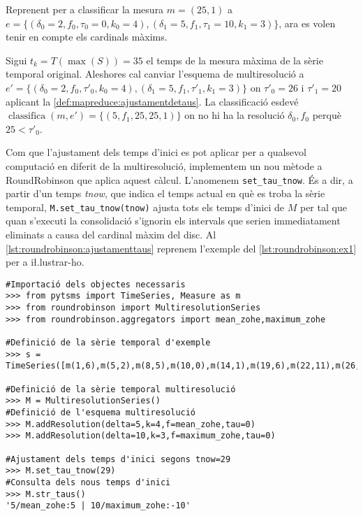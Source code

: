 \begin{example}
  \label{ex:mapreduce:classifica-ajustament}
  Reprenent  per a
  classificar la mesura $m=(25,1)$ a
  $e=\{(\delta_0=2,f_0,\tau_0=0,k_0=4),(\delta_1=5,f_1,\tau_1=10,k_1=3)\}$,
  ara es volen tenir en compte els cardinals màxims.
    
  Sigui $t_k=T(\max(S))=35$ el temps de la mesura màxima de la sèrie
  temporal original. Aleshores cal canviar l'esquema de multiresolució
  a
  $e'=\{(\delta_0=2,f_0,\tau'_0,k_0=4),(\delta_1=5,f_1,\tau'_1,k_1=3)\}$
  on $\tau'_0=26$ i $\tau'_1=20$ aplicant la
  \autoref{def:mapreduce:ajustamentdetaus}. La classificació esdevé
  $\operatorname{classifica}(m,e')=\{ (5,f_1,25,25,1) \}$ on no hi ha
  la resolució $\delta_0,f_0$ perquè $25< \tau'_0$.
\end{example}




Com que l'ajustament dels temps d'inici es pot aplicar per a qualsevol
computació en diferit de la multiresolució, implementem un nou mètode
a RoundRobinson que aplica aquest càlcul. L'anomenem
\lstinline[style=py]+set_tau_tnow+. És a dir, a partir d'un temps
\emph{tnow}, que indica el temps actual en què es troba la sèrie
temporal, \lstinline[style=py]+M.set_tau_tnow(tnow)+ ajusta tots els
temps d'inici de $M$ per tal que quan s'executi la consolidació
s'ignorin els intervals que serien immediatament eliminats a causa del
cardinal màxim del disc.  Al
\autoref{lst:roundrobinson:ajustamenttaus} reprenem l'exemple del
\autoref{lst:roundrobinson:ex1} per a i\l.lustrar-ho.

\begin{lstlisting}[style=py,caption=Exemple d'ajustament dels temps
    d'inici amb RoundRobinson,label=lst:roundrobinson:ajustamenttaus]
#Importació dels objectes necessaris
>>> from pytsms import TimeSeries, Measure as m
>>> from roundrobinson import MultiresolutionSeries
>>> from roundrobinson.aggregators import mean_zohe,maximum_zohe

#Definició de la sèrie temporal d'exemple
>>> s = TimeSeries([m(1,6),m(5,2),m(8,5),m(10,0),m(14,1),m(19,6),m(22,11),m(26,6),m(29,0)])

#Definició de la sèrie temporal multiresolució
>>> M = MultiresolutionSeries()
#Definició de l'esquema multiresolució
>>> M.addResolution(delta=5,k=4,f=mean_zohe,tau=0)
>>> M.addResolution(delta=10,k=3,f=maximum_zohe,tau=0)

#Ajustament dels temps d'inici segons tnow=29
>>> M.set_tau_tnow(29)
#Consulta dels nous temps d'inici
>>> M.str_taus()
'5/mean_zohe:5 | 10/maximum_zohe:-10'
\end{lstlisting}


